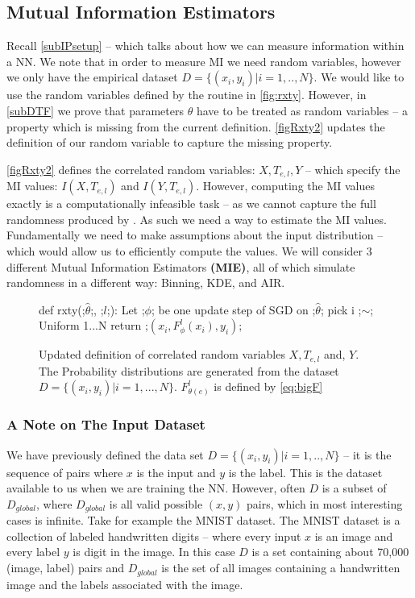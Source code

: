 \documentclass[dissertation.tex]{subfiles}
\begin{document}
\subsection{Mutual Information Estimators}
\label{subMIE}

Recall \autoref{subIPsetup} -- which talks about how we can measure information
within a NN. We note that in order to measure MI we need random variables,
however we only have the empirical dataset $D=\{(x_i,y_i)|i=1,..,N\}$.  We would
like to use the random variables defined by the routine in \autoref{fig:rxty}.
However, in \autoref{subDTF} we prove that parameters $\theta$ have to be
treated as random variables -- a property which is missing from the current
definition. \autoref{figRxty2} updates the definition of our random variable to
capture the missing property. 

\autoref{figRxty2} defines the correlated random variables: $X,T_{e,l},Y$ --
which specify the MI values: $I(X,T_{e,l})$ and $I(Y,T_{e,l})$. However,
computing the MI values exactly is a computationally infeasible task -- as we
cannot capture the full randomness produced by . As such we
need a way to estimate the MI values.  Fundamentally we need to make assumptions
about the input distribution -- which would allow us to efficiently compute the
values. We will consider 3 different Mutual Information Estimators
\textbf{(MIE)}, all of which simulate randomness in a different way: Binning,
KDE, and AIR.

\begin{figure}[h]
    \begin{pythonfigure}
      def rxty(;$\hat\theta$;, ;$l$;):
        Let ;$\phi$; be one update step of SGD on ;$\hat\theta$;
        pick i ;$\sim$; Uniform {1...N}
        return ;$(x_i, F_\phi^l(x_i), y_i)$;
    \end{pythonfigure}
    \caption{
      Updated definition of correlated random variables $X, T_{e,l}$ and, $Y$.
      The Probability distributions are generated from the dataset
      $D=\{(x_i,y_i)|i=1,...,N\}$. $F_{\theta(e)}^l$ is defined by \autoref{eq:bigF}
    }
    \label{figRxty2}
\end{figure}


\subsubsection{A Note on The Input Dataset}
We have previously defined the data set $D=\{(x_i, y_i)|i=1,..,N\}$ -- it
is the sequence of pairs where $x$ is the input and $y$ is the label. This
is the dataset available to us when we are training the NN.
However, often $D$ is a subset of $D_{global}$, where $D_{global}$ is all
valid possible $(x, y)$ pairs, which in most interesting cases is
infinite.
Take for example the MNIST dataset. The MNIST dataset is a collection of
labeled handwritten digits -- where every input $x$ is an image and every
label $y$ is digit in the image. In this case $D$ is a set containing
about 70,000 (image, label) pairs and $D_{global}$ is the set of all
images containing a handwritten image and the labels associated with the
image.
\end{document}
